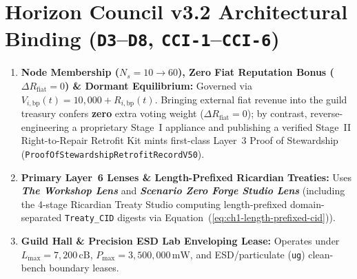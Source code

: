 \section{Horizon Council v3.2 Architectural Binding (\texttt{D3}--\texttt{D8}, \texttt{CCI-1}--\texttt{CCI-6})}
\begin{enumerate}
    \item \textbf{Node Membership ($N_s = 10 \to 60$), Zero Fiat Reputation Bonus ($\Delta R_{\mathrm{fiat}} = 0$) \& Dormant Equilibrium:} Governed via $V_{i,\mathrm{bp}}(t) = 10{,}000 + R_{i,\mathrm{bp}}(t)$. Bringing external fiat revenue into the guild treasury confers \textbf{zero} extra voting weight ($\Delta R_{\mathrm{fiat}} = 0$); by contrast, reverse-engineering a proprietary Stage~I appliance and publishing a verified Stage~II Right-to-Repair Retrofit Kit mints first-class Layer~3 Proof of Stewardship (\texttt{ProofOfStewardshipRetrofitRecordV50}).
    \item \textbf{Primary Layer~6 Lenses \& Length-Prefixed Ricardian Treaties:} Uses \textbf{\textit{The Workshop Lens}} and \textbf{\textit{Scenario Zero Forge Studio Lens}} (including the 4-stage Ricardian Treaty Studio computing length-prefixed domain-separated \texttt{Treaty\_CID} digests via Equation~(\ref{eq:ch1-length-prefixed-cid})).
    \item \textbf{Guild Hall \& Precision ESD Lab Enveloping Lease:} Operates under $L_{\max} = 7{,}200\,\mathrm{cB}$, $P_{\max} = 3{,}500{,}000\,\mathrm{mW}$, and ESD/particulate (\texttt{ug}) clean-bench boundary leases.
\end{enumerate}

